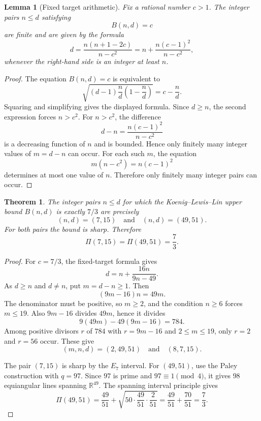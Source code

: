 \documentclass[11pt]{article}
\newtheorem{theorem}{Theorem}
\newtheorem{lemma}{Lemma}
\newcommand{\R}{\mathbb{R}}
\newcommand{\PiRel}{\Pi}
\newcommand{\Bnd}{B}
\begin{document}
\begin{lemma}[Fixed target arithmetic]
Fix a rational number \(c>1\).  The integer pairs \(n\le d\) satisfying
\[
  \Bnd(n,d)=c
\]
are finite and are given by the formula
\[
  d=
  \frac{n(n+1-2c)}{n-c^2}
  =
  n+\frac{n(c-1)^2}{n-c^2},
\]
whenever the right-hand side is an integer at least \(n\).
\end{lemma}

\begin{proof}
The equation \(\Bnd(n,d)=c\) is equivalent to
\[
  \sqrt{(d-1)\frac nd\left(1-\frac nd\right)}=c-\frac nd.
\]
Squaring and simplifying gives the displayed formula.  Since \(d\ge n\), the
second expression forces \(n>c^2\).  For \(n>c^2\), the difference
\[
  d-n=\frac{n(c-1)^2}{n-c^2}
\]
is a decreasing function of \(n\) and is bounded.  Hence only finitely many
integer values of \(m=d-n\) can occur.  For each such \(m\), the equation
\[
  m(n-c^2)=n(c-1)^2
\]
determines at most one value of \(n\).  Therefore only finitely many integer
pairs can occur.
\end{proof}

\begin{theorem}
The integer pairs \(n\le d\) for which the Koenig--Lewis--Lin upper bound
\(\Bnd(n,d)\) is exactly \(7/3\) are precisely
\[
  (n,d)=(7,15)\quad\text{and}\quad(n,d)=(49,51).
\]
For both pairs the bound is sharp.  Therefore
\[
  \PiRel(7,15)=\PiRel(49,51)=\frac73.
\]
\end{theorem}

\begin{proof}
For \(c=7/3\), the fixed-target formula gives
\[
  d=n+\frac{16n}{9n-49}.
\]
As \(d\ge n\) and \(d\ne n\), put \(m=d-n\ge1\).  Then
\[
  (9m-16)n=49m.
\]
The denominator must be positive, so \(m\ge2\), and the condition \(n\ge6\)
forces \(m\le19\).  Also \(9m-16\) divides \(49m\), hence it divides
\[
  9(49m)-49(9m-16)=784.
\]
Among positive divisors \(r\) of \(784\) with \(r=9m-16\) and \(2\le m\le19\),
only \(r=2\) and \(r=56\) occur.  These give
\[
  (m,n,d)=(2,49,51)\quad\text{and}\quad(8,7,15).
\]

The pair \((7,15)\) is sharp by the \(E_7\) interval.  For \((49,51)\), use
the Paley construction with \(q=97\).  Since \(97\) is prime and
\(97\equiv1\pmod4\), it gives \(98\) equiangular lines spanning
\(\R^{49}\).  The spanning interval principle gives
\[
  \PiRel(49,51)=
  \frac{49}{51}+
  \sqrt{50\cdot\frac{49}{51}\cdot\frac2{51}}
  =
  \frac{49}{51}+\frac{70}{51}
  =
  \frac73.
\]
\end{proof}
\end{document}
